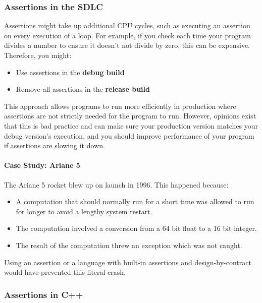 \subsubsection{Assertions in the SDLC} %
\label{ssub:assertions_in_the_sdlc}
Assertions might take up additional CPU cycles, such as executing an assertion on every execution of a loop. For example, if you check each time your program divides a number to ensure it doesn't not divide by zero, this can be expensive. Therefore, you might:
\begin{itemize}
	\item Use assertions in the \textbf{debug build}
	\item Remove all assertions in the \textbf{release build}
\end{itemize}

This approach allows programs to run more efficiently in production where assertions are not strictly needed for the program to run. However, opinions exist that this is bad practice and can make sure your production version matches your debug version's execution, and you should improve performance of your program if assertions are slowing it down.

\paragraph{Case Study: Ariane 5} %
\label{par:case_study_ariane_5}
The Ariane 5 rocket blew up on launch in 1996. This happened because:

\begin{itemize}
	\item A computation that should normally run for a short time was allowed to run for longer to avoid a lengthy system restart.
	\item The computation involved a conversion from a 64 bit float to a 16 bit integer.
	\item The result of the computation threw an exception which was not caught.
\end{itemize}

Using an assertion or a language with built-in assertions and design-by-contract would have prevented this literal crash.


\subsubsection{Assertions in C++} %
\label{ssub:assertions_in_c_}


